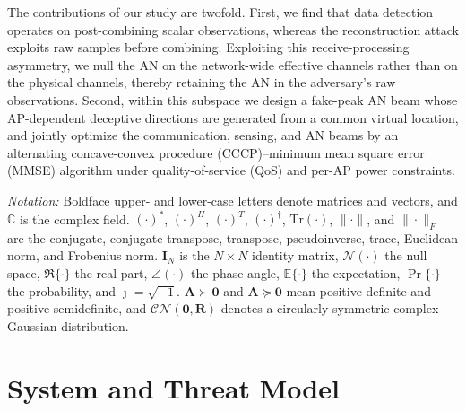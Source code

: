 \documentclass[letterpaper,journal]{IEEEtran}
\begin{document}
The contributions of our study are twofold. First, we find that data detection operates on post-combining scalar observations, whereas the reconstruction attack exploits raw samples before combining. Exploiting this receive-processing asymmetry, we null the AN on the network-wide effective channels rather than on the physical channels, thereby retaining the AN in the adversary's raw observations. Second, within this subspace we design a fake-peak AN beam whose AP-dependent deceptive directions are generated from a common virtual location, and jointly optimize the communication, sensing, and AN beams by an alternating concave-convex procedure (CCCP)--minimum mean square error (MMSE) algorithm under quality-of-service (QoS) and per-AP power constraints.


\emph{Notation:} Boldface upper- and lower-case letters denote matrices and vectors, and $\mathbb{C}$ is the complex field. $(\cdot)^*$, $(\cdot)^H$, $(\cdot)^T$, $(\cdot)^\dagger$, $\mathrm{Tr}(\cdot)$, $\|\cdot\|$, and $\|\cdot\|_F$ are the conjugate, conjugate transpose, transpose, pseudoinverse, trace, Euclidean norm, and Frobenius norm. $\mathbf{I}_N$ is the $N\times N$ identity matrix, $\mathcal{N}(\cdot)$ the null space, $\Re\{\cdot\}$ the real part, $\angle(\cdot)$ the phase angle, $\mathbb{E}\{\cdot\}$ the expectation, $\Pr\{\cdot\}$ the probability, and $\jmath=\sqrt{-1}$. $\mathbf{A}\succ\mathbf{0}$ and $\mathbf{A}\succeq\mathbf{0}$ mean positive definite and positive semidefinite, and $\mathcal{CN}(\mathbf{0},\mathbf{R})$ denotes a circularly symmetric complex Gaussian distribution.

\section{System and Threat Model}
\label{sec:model}
\end{document}
